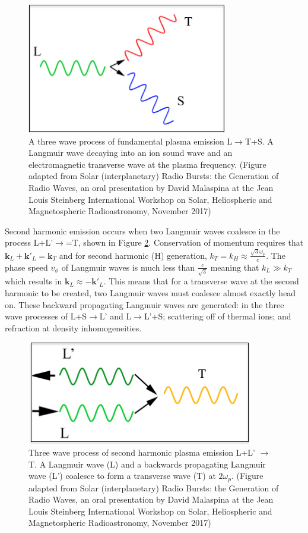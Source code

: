 \begin{figure}
\centering
\includegraphics[width=0.5\columnwidth]{Images/Fundamental_emission_Lwaves.png}
\caption[A three wave process of fundamental plasma emission L$\rightarrow$T+S]{A three wave process of fundamental plasma emission L$\rightarrow$T+S. A Langmuir wave decaying into an ion sound wave and an electromagnetic transverse wave at the plasma frequency. (Figure adapted from Solar (interplanetary) Radio Bursts: the Generation of Radio Waves,	an oral presentation by David Malaspina at the Jean Louis Steinberg International Workshop on Solar, Heliospheric and Magnetospheric Radioastronomy, November 2017)}
\label{fig:Femission}
\end{figure}

Second harmonic emission occurs when two Langmuir waves coalesce in the process L+L'$\rightarrow$=T, shown in Figure \ref{fig:Hemission}. Conservation of momentum requires that $\mathbf{k}_L + \mathbf{k'}_L = \mathbf{k}_T$ and for second harmonic (H) generation, $k_T=k_H \approx \frac{\sqrt{3} \omega_p}{c}$. The phase speed $v_\phi$ of Langmuir waves is much less than $\frac{c}{\sqrt{3}}$ meaning that $k_L \gg k_T$ which results in $\mathbf{k}_L \approx -\mathbf{k'}_L$. This means that for a transverse wave at the second harmonic to be created, two Langmuir waves must coalesce almost exactly head on. These backward propagating Langmuir waves are generated: in the three wave processes of L+S$\rightarrow$L' and L$\rightarrow$L'+S; scattering off of thermal ions; and refraction at density inhomogeneities.
 \begin{figure}

     \centering
     \includegraphics[width=0.5\columnwidth]{Images/Harmonic_emission_Lwaves.png}
     \caption[Three wave process of second harmonic plasma emission L+L' $\rightarrow$ T]{Three wave process of second harmonic plasma emission L+L' $\rightarrow$ T. A Langmuir wave (L) and a backwards propagating Langmuir wave (L') coalesce to form a transverse wave (T) at $2 \omega_p$. (Figure adapted from Solar (interplanetary) Radio Bursts: the Generation of Radio Waves,	an oral presentation by David Malaspina at the Jean Louis Steinberg International Workshop on Solar, Heliospheric and Magnetospheric Radioastronomy, November 2017)}
     \label{fig:Hemission}
 \end{figure}
 
